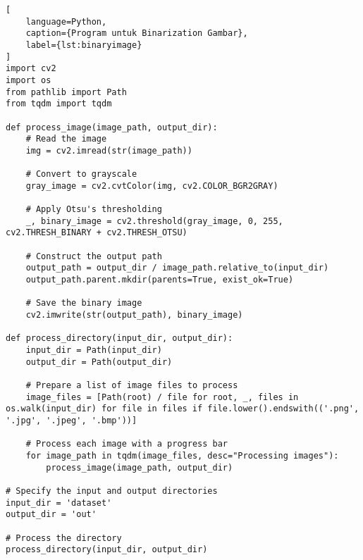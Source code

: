 \begin{lstlisting}[
    language=Python,
    caption={Program untuk Binarization Gambar},
    label={lst:binaryimage}
]
import cv2
import os
from pathlib import Path
from tqdm import tqdm

def process_image(image_path, output_dir):
    # Read the image
    img = cv2.imread(str(image_path))
    
    # Convert to grayscale
    gray_image = cv2.cvtColor(img, cv2.COLOR_BGR2GRAY)
    
    # Apply Otsu's thresholding
    _, binary_image = cv2.threshold(gray_image, 0, 255, cv2.THRESH_BINARY + cv2.THRESH_OTSU)
    
    # Construct the output path
    output_path = output_dir / image_path.relative_to(input_dir)
    output_path.parent.mkdir(parents=True, exist_ok=True)
    
    # Save the binary image
    cv2.imwrite(str(output_path), binary_image)

def process_directory(input_dir, output_dir):
    input_dir = Path(input_dir)
    output_dir = Path(output_dir)

    # Prepare a list of image files to process
    image_files = [Path(root) / file for root, _, files in os.walk(input_dir) for file in files if file.lower().endswith(('.png', '.jpg', '.jpeg', '.bmp'))]
    
    # Process each image with a progress bar
    for image_path in tqdm(image_files, desc="Processing images"):
        process_image(image_path, output_dir)

# Specify the input and output directories
input_dir = 'dataset'
output_dir = 'out'

# Process the directory
process_directory(input_dir, output_dir)
\end{lstlisting}

